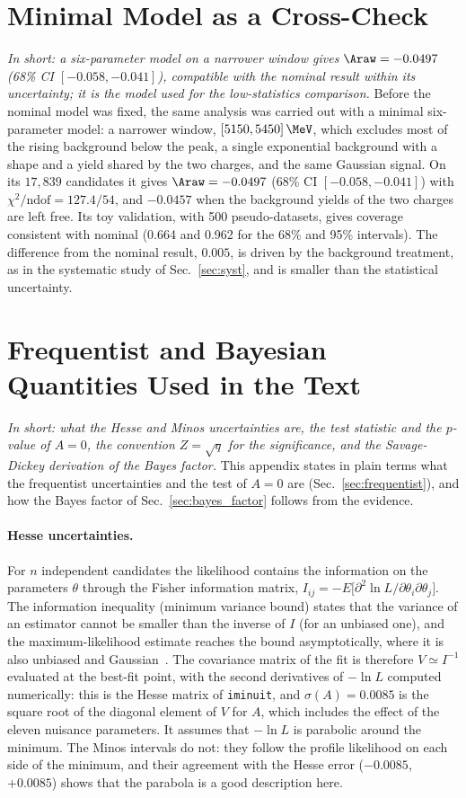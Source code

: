 \section{Minimal Model as a Cross-Check}
\label{sec:bayes_minimal}
\emph{In short: a six-parameter model on a narrower window gives $\Araw=-0.0497$ (68\% CI $[-0.058,-0.041]$), compatible with the nominal result within its uncertainty; it is the model used for the low-statistics comparison.}
Before the nominal model was fixed, the same analysis was carried out with a minimal six-parameter model: a narrower window, $[5150,5450]\,\MeV$, which excludes most of the rising background below the peak, a single exponential background with a shape and a yield shared by the two charges, and the same Gaussian signal. On its $17{,}839$ candidates it gives $\Araw=-0.0497$ (68\% CI $[-0.058,-0.041]$) with $\chi^2/\text{ndof}=127.4/54$, and $-0.0457$ when the background yields of the two charges are left free. Its toy validation, with 500 pseudo-datasets, gives coverage consistent with nominal (0.664 and 0.962 for the 68\% and 95\% intervals). The difference from the nominal result, $0.005$, is driven by the background treatment, as in the systematic study of Sec.~\ref{sec:syst}, and is smaller than the statistical uncertainty.

\section{Frequentist and Bayesian Quantities Used in the Text}
\label{sec:appendix_freq}
\emph{In short: what the Hesse and Minos uncertainties are, the test statistic and the $p$-value of $A=0$, the convention $Z=\sqrt{q}$ for the significance, and the Savage-Dickey derivation of the Bayes factor.}
This appendix states in plain terms what the frequentist uncertainties and the test of $A=0$ are (Sec.~\ref{sec:frequentist}), and how the Bayes factor of Sec.~\ref{sec:bayes_factor} follows from the evidence.

\paragraph{Hesse uncertainties.}
For $n$ independent candidates the likelihood contains the information on the parameters $\theta$ through the Fisher information matrix, $I_{ij}=-E\big[\partial^2\ln L/\partial\theta_i\partial\theta_j\big]$. The information inequality (minimum variance bound) states that the variance of an estimator cannot be smaller than the inverse of $I$ (for an unbiased one), and the maximum-likelihood estimate reaches the bound asymptotically, where it is also unbiased and Gaussian~\cite{cowan}. The covariance matrix of the fit is therefore $V\simeq I^{-1}$ evaluated at the best-fit point, with the second derivatives of $-\ln L$ computed numerically: this is the Hesse matrix of \texttt{iminuit}, and $\sigma(A)=0.0085$ is the square root of the diagonal element of $V$ for $A$, which includes the effect of the eleven nuisance parameters. It assumes that $-\ln L$ is parabolic around the minimum. The Minos intervals do not: they follow the profile likelihood on each side of the minimum, and their agreement with the Hesse error ($-0.0085$, $+0.0085$) shows that the parabola is a good description here.


